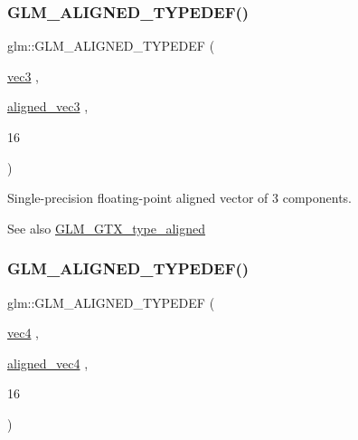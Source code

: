 \subsubsection{\texorpdfstring{G\+L\+M\+\_\+\+A\+L\+I\+G\+N\+E\+D\+\_\+\+T\+Y\+P\+E\+D\+E\+F()}{GLM\_ALIGNED\_TYPEDEF()}\hspace{0.1cm}{\footnotesize\ttfamily [145/209]}}
{\footnotesize\ttfamily glm\+::\+G\+L\+M\+\_\+\+A\+L\+I\+G\+N\+E\+D\+\_\+\+T\+Y\+P\+E\+D\+EF (\begin{DoxyParamCaption}\item[{\hyperlink{group__core__types_ga1c47e8b3386109bc992b6c48e91b0be7}{vec3}}]{,  }\item[{\hyperlink{group__gtc__type__aligned_ga9c54536a3becfd10a44f6b1b8c4aa3d3}{aligned\+\_\+vec3}}]{,  }\item[{16}]{ }\end{DoxyParamCaption})}

Single-\/precision floating-\/point aligned vector of 3 components. \begin{DoxySeeAlso}{See also}
\hyperlink{group__gtx__type__aligned}{G\+L\+M\+\_\+\+G\+T\+X\+\_\+type\+\_\+aligned} 
\end{DoxySeeAlso}
\mbox{\label{group__gtx__type__aligned_ga12fe7b9769c964c5b48dcfd8b7f40198}} 
\subsubsection{\texorpdfstring{G\+L\+M\+\_\+\+A\+L\+I\+G\+N\+E\+D\+\_\+\+T\+Y\+P\+E\+D\+E\+F()}{GLM\_ALIGNED\_TYPEDEF()}\hspace{0.1cm}{\footnotesize\ttfamily [146/209]}}
{\footnotesize\ttfamily glm\+::\+G\+L\+M\+\_\+\+A\+L\+I\+G\+N\+E\+D\+\_\+\+T\+Y\+P\+E\+D\+EF (\begin{DoxyParamCaption}\item[{\hyperlink{group__core__types_ga5881b1b022d7fd1b7218f5916532dd02}{vec4}}]{,  }\item[{\hyperlink{group__gtc__type__aligned_gad26d520694d7b865507819c2d9f2b196}{aligned\+\_\+vec4}}]{,  }\item[{16}]{ }\end{DoxyParamCaption})}

